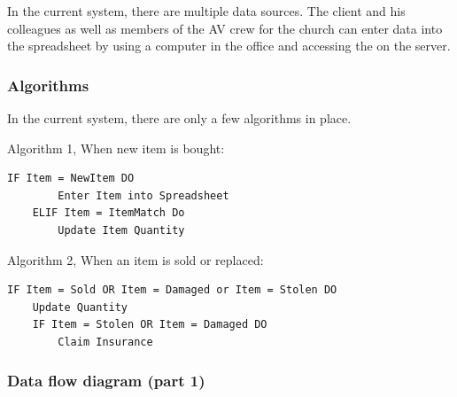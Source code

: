 \documentclass[12pt]{report}
\begin{document}
In the current system, there are multiple data sources. The client and his colleagues as well as members of the AV crew for the church can enter data into the spreadsheet by using a computer in the office and accessing the on the server.

\subsubsection{Algorithms}

In the current system, there are only a few algorithms in place.
\bigskip

Algorithm 1, When new item is bought:
\begin{lstlisting}
IF Item = NewItem DO
        Enter Item into Spreadsheet
    ELIF Item = ItemMatch Do
        Update Item Quantity
\end{lstlisting}
\bigskip

Algorithm 2, When an item is sold or replaced:
\begin{lstlisting}
IF Item = Sold OR Item = Damaged or Item = Stolen DO
    Update Quantity
    IF Item = Stolen OR Item = Damaged DO
        Claim Insurance
\end{lstlisting}



\subsubsection{Data flow diagram (part 1)}
\end{document}
